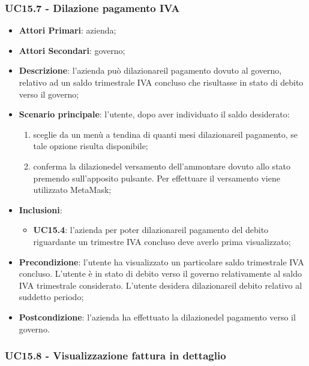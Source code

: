 \subsubsection{UC15.7 - Dilazione pagamento IVA}
\begin{itemize}
	\item \textbf{Attori Primari}: azienda;
	\item \textbf{Attori Secondari}: governo;
	\item \textbf{Descrizione}: l'azienda può dilazionare\glosp il pagamento dovuto al governo, relativo ad un saldo trimestrale IVA concluso che risultasse in stato di debito verso il governo;
	\item \textbf{Scenario principale}: l'utente, dopo aver individuato il saldo desiderato:
	\begin{enumerate}[label=\alph*.]
		\item sceglie da un menù a tendina di quanti mesi dilazionare\glosp il pagamento, se tale opzione risulta disponibile;
		\item conferma la dilazione\glosp del versamento dell'ammontare dovuto allo stato premendo sull'apposito pulsante. Per effettuare il versamento viene utilizzato MetaMask\glo;
	\end{enumerate}
	 
	\item \textbf{Inclusioni}:
	\begin{itemize}
		\item \textbf{UC15.4}: l'azienda per poter dilazionare\glosp il pagamento del debito riguardante un trimestre IVA concluso deve averlo prima visualizzato;
	\end{itemize}
	\item \textbf{Precondizione}: l'utente ha visualizzato un particolare saldo trimestrale IVA concluso. L'utente è in stato di debito verso il governo relativamente al saldo IVA trimestrale considerato. L'utente desidera dilazionare\glosp il debito relativo al suddetto periodo; 
	\item \textbf{Postcondizione}: l'azienda ha effettuato la dilazione\glosp del pagamento verso il governo.
\end{itemize} 

\subsubsection{UC15.8 - Visualizzazione fattura in dettaglio}


